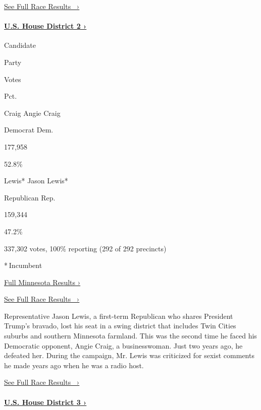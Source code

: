 \href{https://www.nytimes3xbfgragh.onion/elections/results/minnesota-house-district-1}{See
Full Race Results~ ›}

\hypertarget{us-house-district-2-}{%
\paragraph{\texorpdfstring{\href{https://www.nytimes3xbfgragh.onion/elections/results/minnesota-house-district-2}{U.S.
House District 2
›}}{U.S. House District 2 ›}}\label{us-house-district-2-}}

Candidate

Party

Votes

Pct.

 Craig Angie Craig

Democrat Dem.

177,958

52.8\%

 Lewis* Jason Lewis*

Republican Rep.

159,344

47.2\%

337,302 votes, 100\% reporting (292 of 292 precincts)

* Incumbent

\href{https://www.nytimes3xbfgragh.onion/interactive/2018/11/06/us/elections/results-minnesota-elections.html}{Full
Minnesota Results ›}

\href{https://www.nytimes3xbfgragh.onion/elections/results/minnesota-house-district-2}{See
Full Race Results~ ›}

Representative Jason Lewis, a first-term Republican who shares President
Trump's bravado, lost his seat in a swing district that includes Twin
Cities suburbs and southern Minnesota farmland. This was the second time
he faced his Democratic opponent, Angie Craig, a businesswoman. Just two
years ago, he defeated her. During the campaign, Mr. Lewis was
criticized for sexist comments he made years ago when he was a radio
host.

\href{https://www.nytimes3xbfgragh.onion/elections/results/minnesota-house-district-2}{See
Full Race Results~ ›}

\hypertarget{us-house-district-3-}{%
\paragraph{\texorpdfstring{\href{https://www.nytimes3xbfgragh.onion/elections/results/minnesota-house-district-3}{U.S.
House District 3
›}}{U.S. House District 3 ›}}\label{us-house-district-3-}}

